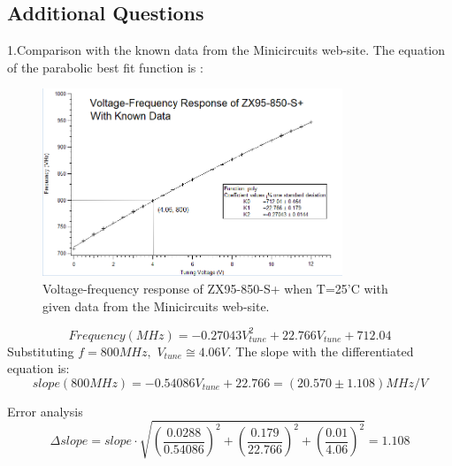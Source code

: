\subsection{Additional Questions}
1.Comparison with the known data from the Minicircuits web-site. The equation of the parabolic best fit function is :
\begin{figure}[h]
\includegraphics[width=0.8\textwidth]{figures/partA2.png}
\caption{Voltage-frequency response of ZX95-850-S+ when T=25'C with given data from the Minicircuits web-site. }
\end{figure}

\begin{equation}
    Frequency(MHz)=-0.27043V_{tune}^{2}+22.766V_{tune}+712.04 \label{V2F}
\end{equation}
Substituting $f=800MHz,$ $V_{tune}\cong 4.06V$. The slope with the differentiated equation is:
\begin{equation}
    slope(800MHz)=-0.54086V_{tune}+22.766=(20.570 \pm 1.108)MHz/V
\end{equation}

Error analysis
\begin{equation}
        \Delta slope=slope\cdot \sqrt{(\frac{0.0288}{0.54086})^{2}+(\frac{0.179}{22.766})^{2}+(\frac{0.01}{4.06})^{2}}=1.108
\end{equation}

